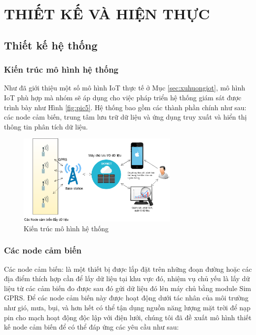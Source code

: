 \ifpdf
\graphicspath{{Chapter3/Figs/Raster/}{Chapter3/Figs/PDF/}{Chapter3/Figs/}{Chapter3/Figs/Web/}{Chapter3/Figs/Server/}{Chapter3/Figs/Mobile/}}
\else
\graphicspath{{Chapter3/Figs/Vector/}{Chapter3/Figs/}}
\fi

\chapter{THIẾT KẾ VÀ HIỆN THỰC}
\section{Thiết kế hệ thống}
\subsection{Kiến trúc mô hình hệ thống}\label{sec:struc}
Như đã giới thiệu một số mô hình IoT thực tế ở Mục \ref{sec:xuhuongiot}, mô hình IoT phù hợp mà nhóm sẽ áp dụng cho việc pháp triển hệ thống giám sát được trình bày như Hình \ref{fig:pic5}. Hệ thống bao gồm các thành phần chính như sau: các node cảm biến, trung tâm lưu trữ dữ liệu và ứng dụng truy xuất và hiển thị thông tin phân tích dữ liệu.
\begin{figure}[H]
	\centering    
	\includegraphics[width=0.7\textwidth]{system}
	\caption[Kiến trúc mô hình hệ thống]{Kiến trúc mô hình hệ thống}
	\label{fig:system}
\end{figure}

\newpage

\subsection{Các node cảm biến}\label{sec:cacloaicambien}
Các node cảm biến: là một thiết bị được lắp đặt trên những đoạn đường hoặc các địa điểm thích hợp cần để lấy dữ liệu tại khu vực đó, nhiệm vụ chủ yếu là lấy dữ liệu từ các cảm biến đo được sau đó gửi dữ liệu đó lên máy chủ bằng module Sim GPRS.
Để các node cảm biến này được hoạt động dưới tác nhân của môi trường như gió, mưa, bụi, và hơn hết có thể tận dụng nguồn năng lượng mặt trời để nạp pin cho mạch hoạt động độc lập với điện lưới, chúng tôi đã đề xuất mô hình thiết kế node cảm biến để có thể đáp ứng các yêu cầu như sau:
 
